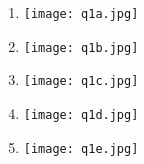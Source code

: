 \begin{question}

    \begin{enumerate}[label=\textbf{\alph*})]
        \item 
        \begin{minipage}{\textwidth}
            \centering 
            \texttt{[image: q1a.jpg]}
        \end{minipage}
        \item 
        \begin{minipage}{\textwidth}
            \centering 
            \texttt{[image: q1b.jpg]}
        \end{minipage}
        \item 
        \begin{minipage}{\textwidth}
            \centering 
            \texttt{[image: q1c.jpg]}
        \end{minipage}
        \item 
        \begin{minipage}{\textwidth}
            \centering 
            \texttt{[image: q1d.jpg]}
        \end{minipage}
        \item 
        \begin{minipage}{\textwidth}
            \centering 
            \texttt{[image: q1e.jpg]}
        \end{minipage}

    \end{enumerate}	
	
\end{question}